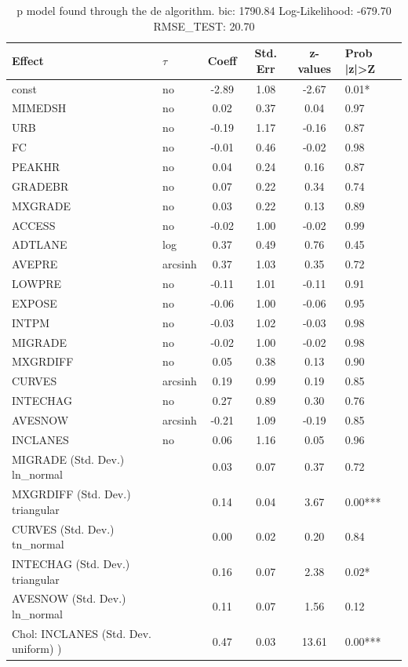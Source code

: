 \begin{table}
	\caption{p model found through the de algorithm. bic: 1790.84 Log-Likelihood: -679.70 RMSE_TEST: 20.70}
	\begin{center}
		\begin{tabular}{|l|l|c|c|c|l|}
			\hline
			Effect & $\tau$ & Coeff & Std. Err & z-values & Prob |z|>Z \\
			\hline
			const & no & -2.89 & 1.08 & -2.67 & 0.01* \\
			\hline
			MIMEDSH & no & 0.02 & 0.37 & 0.04 & 0.97 \\
			\hline
			URB & no & -0.19 & 1.17 & -0.16 & 0.87 \\
			\hline
			FC & no & -0.01 & 0.46 & -0.02 & 0.98 \\
			\hline
			PEAKHR & no & 0.04 & 0.24 & 0.16 & 0.87 \\
			\hline
			GRADEBR & no & 0.07 & 0.22 & 0.34 & 0.74 \\
			\hline
			MXGRADE & no & 0.03 & 0.22 & 0.13 & 0.89 \\
			\hline
			ACCESS & no & -0.02 & 1.00 & -0.02 & 0.99 \\
			\hline
			ADTLANE & log & 0.37 & 0.49 & 0.76 & 0.45 \\
			\hline
			AVEPRE & arcsinh & 0.37 & 1.03 & 0.35 & 0.72 \\
			\hline
			LOWPRE & no & -0.11 & 1.01 & -0.11 & 0.91 \\
			\hline
			EXPOSE & no & -0.06 & 1.00 & -0.06 & 0.95 \\
			\hline
			INTPM & no & -0.03 & 1.02 & -0.03 & 0.98 \\
			\hline
			MIGRADE & no & -0.02 & 1.00 & -0.02 & 0.98 \\
			\hline
			MXGRDIFF & no & 0.05 & 0.38 & 0.13 & 0.90 \\
			\hline
			CURVES & arcsinh & 0.19 & 0.99 & 0.19 & 0.85 \\
			\hline
			INTECHAG & no & 0.27 & 0.89 & 0.30 & 0.76 \\
			\hline
			AVESNOW & arcsinh & -0.21 & 1.09 & -0.19 & 0.85 \\
			\hline
			INCLANES & no & 0.06 & 1.16 & 0.05 & 0.96 \\
			\hline
			MIGRADE (Std. Dev.) ln_normal &  & 0.03 & 0.07 & 0.37 & 0.72 \\
			\hline
			MXGRDIFF (Std. Dev.) triangular &  & 0.14 & 0.04 & 3.67 & 0.00*** \\
			\hline
			CURVES (Std. Dev.) tn_normal &  & 0.00 & 0.02 & 0.20 & 0.84 \\
			\hline
			INTECHAG (Std. Dev.) triangular &  & 0.16 & 0.07 & 2.38 & 0.02* \\
			\hline
			AVESNOW (Std. Dev.) ln_normal &  & 0.11 & 0.07 & 1.56 & 0.12 \\
			\hline
			 Chol: INCLANES (Std. Dev. uniform) ) &  & 0.47 & 0.03 & 13.61 & 0.00*** \\
			\hline
		\end{tabular}
	\end{center}
\end{table}